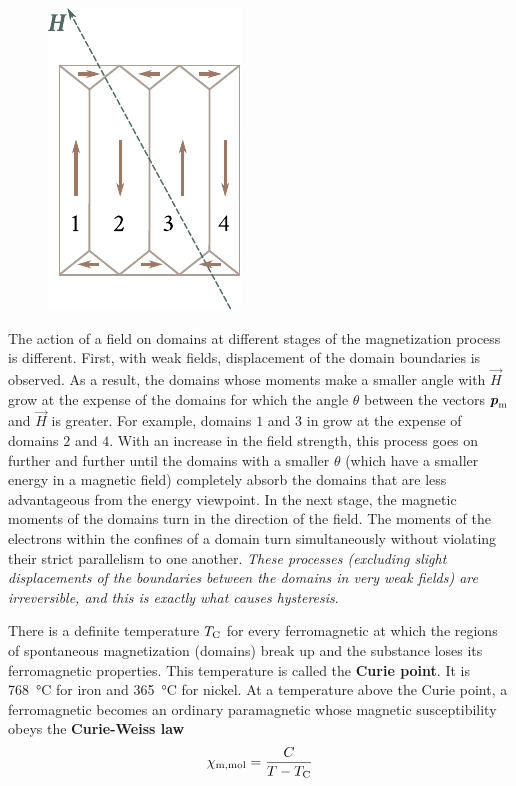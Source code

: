 \begin{figure}[t]
	\begin{center}
		\includegraphics[scale=1]{figures/ch_07/fig_7_20.pdf}
		\caption[]{}
		\label{fig:7_20}
	\end{center}
	\vspace{-0.8cm}
\end{figure}

The action of a field on domains at different stages of the magnetization process is different.
First, with weak fields, displacement of the domain boundaries is observed.
As a result, the domains whose moments make a smaller angle with $\vec{H}$ grow at the expense of the domains for which the angle $\theta$ between the vectors $\boldsymbol{p}_{\text{m}}$ and $\vec{H}$ is greater.
For example, domains $1$ and $3$ in  grow at the expense of domains $2$ and $4$.
With an increase in the field strength, this process goes on further and further until the domains with a smaller $\theta$ (which have a smaller energy in a magnetic field) completely absorb the domains that are less advantageous from the energy viewpoint.
In the next stage, the magnetic moments of the domains turn in the direction of the field.
The moments of the electrons within the confines of a domain turn simultaneously without violating their
strict parallelism to one another.
\textit{These processes (excluding slight displacements of the boundaries between the domains in very weak fields) are irreversible, and this is exactly what causes hysteresis}.

There is a definite temperature $T_{\text{C}}$ for every ferromagnetic at which the regions of spontaneous magnetization (domains) break up and the substance loses its ferromagnetic properties.
This temperature is called the \textbf{Curie point}. It is \SI{768}{\degreeCelsius} for iron and \SI{365}{\degreeCelsius} for nickel.
At a temperature above the Curie point, a ferromagnetic becomes an ordinary paramagnetic whose magnetic susceptibility obeys the \textbf{Curie-Weiss law}
\begin{equation}\label{eq:7_60}
    \chi_{\text{m,mol}} = \frac{C}{T - T_{\text{C}}}
\end{equation}

